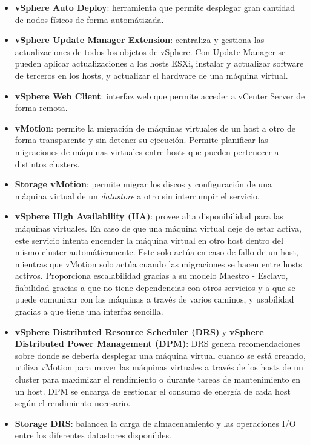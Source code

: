 \begin{itemize}
    

    \item \textbf{vSphere Auto Deploy}: herramienta que permite desplegar gran cantidad de nodos físicos de forma automátizada.
    
    \item \textbf{vSphere Update Manager Extension}: centraliza y gestiona las actualizaciones de todos los objetos de vSphere. Con Update Manager se pueden aplicar actualizaciones a los hosts ESXi, instalar y actualizar software de terceros en los hosts, y actualizar el hardware de una máquina virtual.
   
    \item \textbf{vSphere Web Client}: interfaz web que permite acceder a vCenter Server de forma remota.
    
    \item \textbf{vMotion}: permite la migración de máquinas virtuales de un host a otro de forma transparente y sin detener su ejecución. Permite planificar las migraciones de máquinas virtuales entre hosts que pueden pertenecer a distintos clusters.
    
    \item \textbf{Storage vMotion}: permite migrar los discos y configuración de una máquina virtual de un \textit{datastore} a otro sin interrumpir el servicio.
    
    \item \textbf{vSphere High Availability (HA)}: provee alta disponibilidad para las máquinas virtuales. En caso de que una máquina virtual deje de estar activa, este servicio intenta encender la máquina  virtual en otro host dentro del mismo cluster automáticamente. Este solo actúa en caso de fallo de un host, mientras que vMotion solo actúa cuando las migraciones se hacen entre hosts activos. Proporciona escalabilidad gracias a su modelo Maestro - Esclavo, fiabilidad gracias a que no tiene dependencias con otros servicios y a que se puede comunicar con las máquinas a través de varios caminos, y usabilidad gracias a que tiene una interfaz sencilla.
    
    \item \textbf{vSphere Distributed Resource Scheduler (DRS)} y \textbf{vSphere Distributed Power Management (DPM)}: DRS genera recomendaciones sobre donde se debería desplegar una máquina virtual cuando se está creando, utiliza vMotion para mover las máquinas virtuales a través de los hosts de un cluster para maximizar el rendimiento o durante tareas de mantenimiento en un host. DPM se encarga de gestionar el consumo de energía de cada host según el rendimiento necesario.
    \item \textbf{Storage DRS}: balancea la carga de almacenamiento y las operaciones I/O entre los diferentes datastores disponibles.
    

\end{itemize}
